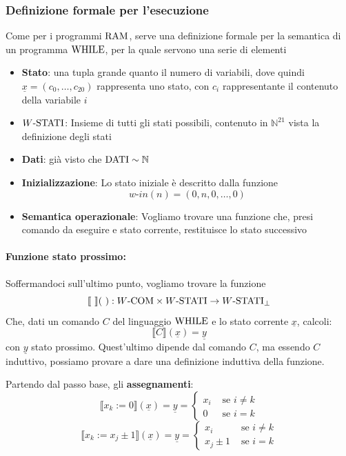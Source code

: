 \subsubsection{Definizione formale per l'esecuzione}
Come per i programmi $\text{RAM}$, serve una definizione formale per la semantica di un programma $\text{WHILE}$, per la quale servono una serie di elementi
\begin{itemize}
	\item \textbf{Stato}: una tupla grande quanto il numero di variabili, dove quindi $\underline{x} = (c_0, \dots, c_{20})$ rappresenta uno stato, con $c_i$ rappresentante il contenuto della variabile $i$
	\item \textbf{$W\text{-STATI}$}: Insieme di tutti gli stati possibili, contenuto in $\mathbb{N}^{21}$ vista la definizione degli stati 
	\item \textbf{Dati}: già visto che $\text{DATI} \sim \mathbb{N}$
	\item \textbf{Inizializzazione}: Lo stato iniziale è descritto dalla funzione 
	$$ w\text{-}in(n) = (0, n, 0, \dots, 0) $$
	\item \textbf{Semantica operazionale}: Vogliamo trovare una funzione che, presi comando da eseguire e stato corrente, restituisce lo stato successivo
\end{itemize}
\paragraph{Funzione stato prossimo:} Soffermandoci sull'ultimo punto, vogliamo trovare la funzione
$$  \llbracket \ \rrbracket ( \ ): W\text{-COM} \times W\text{-STATI} \rightarrow W\text{-STATI}_\bot $$
Che, dati un comando $C$ del linguaggio $\text{WHILE}$ e lo stato corrente $\underline{x}$, calcoli:
$$ \llbracket C \rrbracket (\underline{x}) = \underline{y} $$
con $\underline{y}$ stato prossimo. Quest'ultimo dipende dal comando $C$, ma essendo $C$ induttivo, possiamo provare a dare una definizione induttiva della funzione.

Partendo dal passo base, gli \textbf{assegnamenti}:
$$
\llbracket x_k := 0 \rrbracket (\underline{x}) = \underline{y} = \begin{cases}
	x_i & \text{ se } i \neq k \\
	0 & \text{ se } i = k
\end{cases}
$$
$$ 
\llbracket x_k := x_j \pm 1 \rrbracket (\underline{x}) = \underline{y} = \begin{cases}
	x_i & \text{ se } i \neq k \\
	x_j \pm 1 & \text{ se } i = k
\end{cases}
$$

